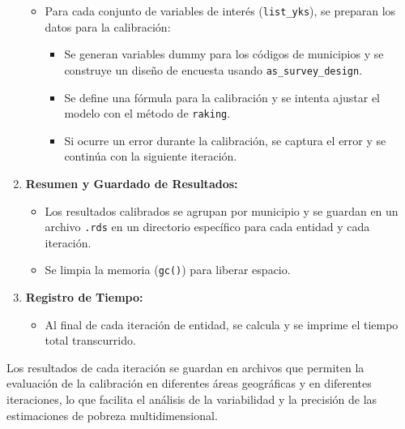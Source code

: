 \documentclass[
  12pt,
]{book}
\providecommand{\tightlist}{%
  \setlength{\itemsep}{0pt}\setlength{\parskip}{0pt}}
\begin{document}
\begin{enumerate}
  \begin{itemize}
  \tightlist
  \item
    Para cada conjunto de variables de interés (\texttt{list\_yks}), se preparan los datos para la calibración:

    \begin{itemize}
    \tightlist
    \item
      Se generan variables dummy para los códigos de municipios y se construye un diseño de encuesta usando \texttt{as\_survey\_design}.
    \item
      Se define una fórmula para la calibración y se intenta ajustar el modelo con el método de \texttt{raking}.
    \item
      Si ocurre un error durante la calibración, se captura el error y se continúa con la siguiente iteración.
    \end{itemize}
  \end{itemize}
\item
  \textbf{Resumen y Guardado de Resultados:}

  \begin{itemize}
  \tightlist
  \item
    Los resultados calibrados se agrupan por municipio y se guardan en un archivo \texttt{.rds} en un directorio específico para cada entidad y cada iteración.
  \item
    Se limpia la memoria (\texttt{gc()}) para liberar espacio.
  \end{itemize}
\item
  \textbf{Registro de Tiempo:}

  \begin{itemize}
  \tightlist
  \item
    Al final de cada iteración de entidad, se calcula y se imprime el tiempo total transcurrido.
  \end{itemize}
\end{enumerate}

Los resultados de cada iteración se guardan en archivos que permiten la evaluación de la calibración en diferentes áreas geográficas y en diferentes iteraciones, lo que facilita el análisis de la variabilidad y la precisión de las estimaciones de pobreza multidimensional.
\end{document}
